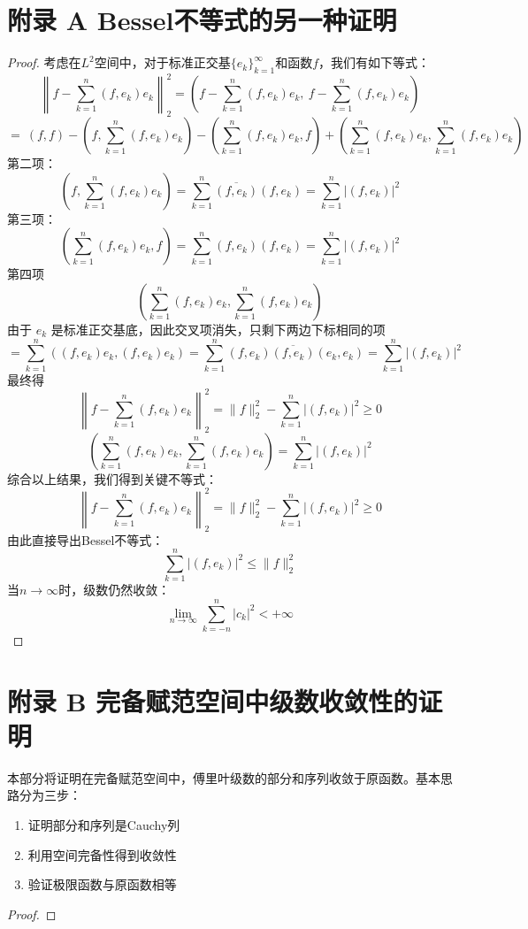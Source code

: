 \documentclass[linespread=1.5,openany]{book}%
\theoremstyle{plain}
\begin{document}
{{{{{{{									\section{附录 A Bessel不等式的另一种证明}
									{\begin{proof}
											考虑在$L^2$空间中，对于标准正交基$\{e_k\}_{k=1}^\infty$和函数$f$，我们有如下等式：
											\[
											\left\| f - \sum_{k=1}^n (f, e_k) e_k \right\|_2^2 = \left( f - \sum_{k=1}^n (f, e_k) e_k,\ f - \sum_{k=1}^n (f, e_k) e_k \right)
											\]
											\[
											= \ (f, f) - \left( f, \sum_{k=1}^n (f, e_k) e_k \right) - \left( \sum_{k=1}^n (f, e_k) e_k, f \right) + \left( \sum_{k=1}^n (f, e_k) e_k, \sum_{k=1}^n (f, e_k) e_k \right)
											\]
											第二项：
											\[
											\left( f, \sum_{k=1}^n (f, e_k) e_k \right) = \sum_{k=1}^n \overline{(f, e_k)} (f, e_k) = \sum_{k=1}^n |(f, e_k)|^2
											\]
											第三项：
											\[
											\left( \sum_{k=1}^n (f, e_k) e_k, f \right)  = \sum_{k=1}^n (f, e_k) {(f, e_k)} = \sum_{k=1}^n |(f, e_k)|^2
											\]
											第四项
											\[
											\left( \sum_{k=1}^n (f, e_k) e_k, \sum_{k=1}^n (f, e_k) e_k \right)
											\]
											由于 \(e_k\) 是标准正交基底，因此交叉项消失，只剩下两边下标相同的项
											\[
											= \sum_{k=1}^n \left( (f, e_k) e_k, (f, e_k) e_k \right) = \sum_{k=1}^n (f, e_k) \overline{(f, e_k)} (e_k, e_k) = \sum_{k=1}^n |(f, e_k)|^2
											\]
											最终得
											\[
											\left\| f - \sum_{k=1}^n (f, e_k) e_k \right\|_2^2 = \|f\|_2^2 - \sum_{k=1}^n |(f, e_k)|^2 \geq 0
											\]\[
											\left( \sum_{k=1}^n (f, e_k) e_k, \sum_{k=1}^n (f, e_k) e_k \right) = \sum_{k=1}^n |(f, e_k)|^2
											\]
											综合以上结果，我们得到关键不等式：
											\[\left\| f - \sum_{k=1}^n (f, e_k) e_k \right\|_2^2 = \|f\|_2^2 - \sum_{k=1}^n |(f, e_k)|^2 \geq 0\]
											由此直接导出Bessel不等式：
											\[\sum_{k=1}^n |(f, e_k)|^2 \leq \|f\|_2^2\]
											当$n \to \infty$时，级数仍然收敛：
											\[\lim_{n \to \infty} \sum_{k=-n}^n |c_k|^2 < +\infty	\] \end{proof}
									}\newpage
									\section{附录 B 完备赋范空间中级数收敛性的证明}
									{ 	
										本部分将证明在完备赋范空间中，傅里叶级数的部分和序列收敛于原函数。基本思路分为三步：
										\begin{enumerate}
											\item 证明部分和序列是Cauchy列
											\item 利用空间完备性得到收敛性
											\item 验证极限函数与原函数相等
										\end{enumerate}
										\begin{proof}
											

\end{proof}}}}}}}}}
\end{document}
